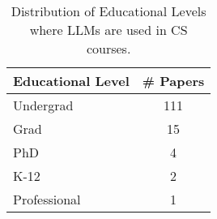 \begin{table}[ht]
    \footnotesize
    \centering
    \caption{Distribution of Educational Levels where LLMs are used in CS courses.}
    \begin{tabular}{@{}l c@{}}
        \toprule
        \textbf{Educational Level} & \textbf{\# Papers} \\
        \midrule
		Undergrad & 111 \\
		Grad & 15 \\
		PhD & 4 \\
		K-12 & 2 \\
		Professional & 1 \\
	\bottomrule
    \end{tabular}
    \label{tab:edu_level}
\end{table}